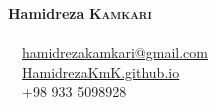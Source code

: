 \documentclass{resume} %
\begin{document}
\begin{minipage}{0.48\textwidth}
{\Huge \textcolor{RoyalPurple!100}{\bf Hamidreza} \textcolor{RoyalPurple!100}{\scshape \bf Kamkari}}\\
\\
‌\hspace{6mm} \faAt \ \ \textcolor{Black!70}{\href{mailto:hamidrezakamkari@gmail.com}{hamidrezakamkari@gmail.com}}\\
‌\hspace{6mm} \faGlobe \ \ \textcolor{Black!70}{\href{https://hamidrezakmk.github.io/}{\underline{HamidrezaKmK.github.io}}}\\
‌\hspace{6mm} \faPhone \ \ \textcolor{Black!70}{+98 933 5098928}\\
\end{minipage} \begin{minipage}{0.48\textwidth}
\begin{flushright}
\end{flushright}
\end{minipage}
\\
\end{document}
